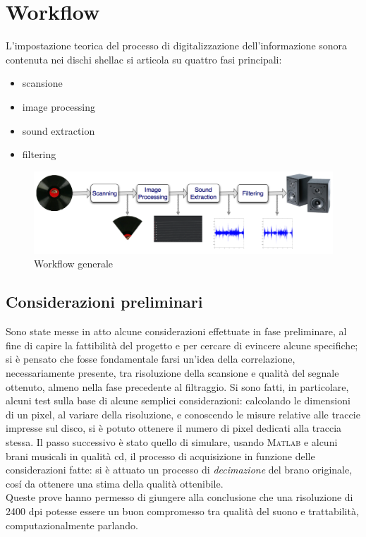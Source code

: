 \section{Workflow}
L'impostazione teorica del processo di digitalizzazione dell'informazione sonora contenuta nei dischi shellac si articola su quattro fasi principali:
\begin{itemize}
	\item scansione
	\item image processing
	\item sound extraction
	\item filtering
\end{itemize}
\begin{figure}[h!t]
\begin{center}
\includegraphics[scale=0.2]{./img/block-scheme.png}
\caption{Workflow generale}
\end{center}
\end{figure}

\subsection{Considerazioni preliminari}
Sono state messe in atto alcune considerazioni effettuate in fase 
preliminare, al fine di capire la fattibilità del progetto e per cercare
di evincere alcune specifiche; si è pensato che fosse fondamentale farsi
un'idea della correlazione, necessariamente presente, tra risoluzione
della scansione e qualità del segnale ottenuto, almeno nella fase precedente
al filtraggio. Si sono fatti, in particolare, alcuni test sulla base di
alcune semplici considerazioni: calcolando le dimensioni di un pixel, al
variare della risoluzione, e conoscendo le misure relative alle traccie
impresse sul disco, si è potuto ottenere il numero di pixel dedicati alla
traccia stessa. Il passo successivo è stato quello di simulare, usando
\textsc{Matlab} e alcuni brani musicali in qualità cd, il processo di 
acquisizione in funzione delle considerazioni fatte: si è attuato un 
processo di \emph{decimazione} del brano originale, cos\'i da ottenere una
stima della qualità ottenibile. \\
Queste prove hanno permesso di giungere alla conclusione che una risoluzione
di 2400 dpi potesse essere un buon compromesso tra qualità del suono e
trattabilità, computazionalmente parlando.

